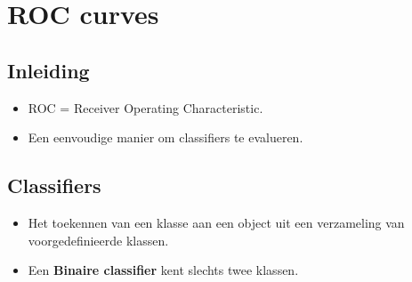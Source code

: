 \chapter{ROC curves}
\section{Inleiding}
\begin{itemize}
	\item ROC = Receiver Operating Characteristic.
	\item Een eenvoudige manier om classifiers te evalueren.
\end{itemize}

\section{Classifiers}
\begin{itemize}
	\item Het toekennen van een klasse aan een object uit een verzameling van voorgedefinieerde klassen.
	\item Een \textbf{Binaire classifier} kent slechts twee klassen. 
\end{itemize}

